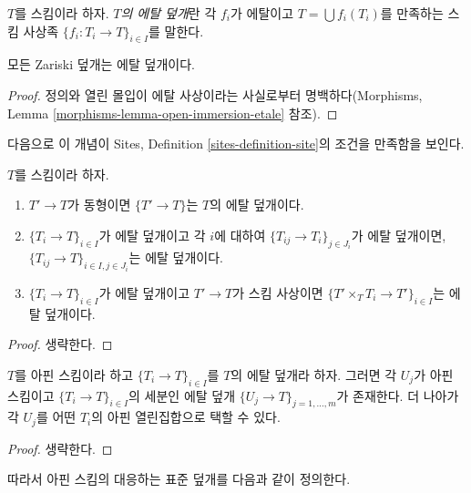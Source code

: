 \begin{definition}
\label{definition-etale-covering}
$T$를 스킴이라 하자. {\it $T$의 에탈 덮개}란 각 $f_i$가 에탈이고
$T = \bigcup f_i(T_i)$를 만족하는 스킴 사상족
$\{f_i : T_i \to T\}_{i \in I}$를 말한다.
\end{definition}

\begin{lemma}
\label{lemma-zariski-etale}
모든 Zariski 덮개는 에탈 덮개이다.
\end{lemma}

\begin{proof}
정의와 열린 몰입이 에탈 사상이라는 사실로부터 명백하다(Morphisms,
Lemma \ref{morphisms-lemma-open-immersion-etale} 참조).
\end{proof}

\noindent
다음으로 이 개념이 Sites, Definition \ref{sites-definition-site}의
조건을 만족함을 보인다.

\begin{lemma}
\label{lemma-etale}
$T$를 스킴이라 하자.
\begin{enumerate}
\item $T' \to T$가 동형이면 $\{T' \to T\}$는 $T$의 에탈 덮개이다.
\item $\{T_i \to T\}_{i\in I}$가 에탈 덮개이고 각 $i$에 대하여
$\{T_{ij} \to T_i\}_{j\in J_i}$가 에탈 덮개이면,
$\{T_{ij} \to T\}_{i \in I, j\in J_i}$는 에탈 덮개이다.
\item $\{T_i \to T\}_{i\in I}$가 에탈 덮개이고 $T' \to T$가 스킴
사상이면 $\{T' \times_T T_i \to T'\}_{i\in I}$는 에탈 덮개이다.
\end{enumerate}
\end{lemma}

\begin{proof}
생략한다.
\end{proof}

\begin{lemma}
\label{lemma-etale-affine}
$T$를 아핀 스킴이라 하고 $\{T_i \to T\}_{i \in I}$를 $T$의 에탈
덮개라 하자. 그러면 각 $U_j$가 아핀 스킴이고
$\{T_i \to T\}_{i \in I}$의 세분인 에탈 덮개
$\{U_j \to T\}_{j = 1, \ldots, m}$가 존재한다. 더 나아가 각 $U_j$를
어떤 $T_i$의 아핀 열린집합으로 택할 수 있다.
\end{lemma}

\begin{proof}
생략한다.
\end{proof}

\noindent
따라서 아핀 스킴의 대응하는 표준 덮개를 다음과 같이 정의한다.

